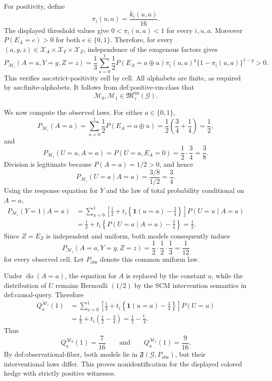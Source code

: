 For positivity, define
\[
 \pi_i(u,a)=\frac{k_i(u,a)}{16}.
\]
The displayed threshold values give \(0<\pi_i(u,a)<1\) for every \(i,u,a\).  Moreover \(P(E_A=e)>0\) for both \(e\in\{0,1\}\).  Therefore, for every \((a,y,z)\in\mathcal X_A\times\mathcal X_Y\times\mathcal X_Z\), independence of the exogenous factors gives
\[
 P_{\mathcal M_i}(A=a,Y=y,Z=z)
 =\frac13\sum_{u=0}^1
 \frac12 P(E_A=a\oplus u)
 \pi_i(u,a)^y\{1-\pi_i(u,a)\}^{1-y}>0.
\]
This verifies ass:strict-positivity cell by cell.  All alphabets are finite, as required by ass:finite-alphabets.  It follows from def:positive-rm-class that
\[
 \mathcal M_0,\mathcal M_1\in
 \mathfrak M_{+}^{\mathrm{rm}}(\mathcal G).
\]

We now compute the observed laws.  For either \(a\in\{0,1\}\),
\[
 P_{\mathcal M_i}(A=a)
 =\sum_{u=0}^1\frac12P(E_A=a\oplus u)
 =\frac12\left(\frac34+\frac14\right)
 =\frac12,
\]
and
\[
 P_{\mathcal M_i}(U=a,A=a)
 =P(U=a,E_A=0)
 =\frac12\cdot\frac34
 =\frac38.
\]
Division is legitimate because \(P(A=a)=1/2>0\), and hence
\[
 P_{\mathcal M_i}(U=a\mid A=a)=\frac{3/8}{1/2}=\frac34.
\]
Using the response equation for \(Y\) and the law of total probability conditional on \(A=a\),
\[
 \begin{aligned}
 P_{\mathcal M_i}(Y=1\mid A=a)
 &=\sum_{u=0}^1
 \left[\frac12+t_i\left\{\mathbf 1(u=a)-\frac34\right\}\right]
 P(U=u\mid A=a)\\
 &=\frac12+t_i\left\{P(U=a\mid A=a)-\frac34\right\}
 =\frac12.
 \end{aligned}
\]
Since \(Z=E_Z\) is independent and uniform, both models consequently induce
\[
 P_{\mathcal M_i}(A=a,Y=y,Z=z)
 =\frac12\cdot\frac12\cdot\frac13
 =\frac1{12}
\]
for every observed cell.  Let \(P_{\mathrm{obs}}\) denote this common uniform law.

Under \(\operatorname{do}(A=a)\), the equation for \(A\) is replaced by the constant \(a\), while the distribution of \(U\) remains Bernoulli \(\left(1/2\right)\) by the SCM intervention semantics in def:causal-query.  Therefore
\[
 \begin{aligned}
 Q_a^{\mathcal M_i}(1)
 &=\sum_{u=0}^1
 \left[\frac12+t_i\left\{\mathbf 1(u=a)-\frac34\right\}\right]P(U=u)\\
 &=\frac12+t_i\left(\frac12-\frac34\right)
 =\frac12-\frac{t_i}{4}.
 \end{aligned}
\]
Thus
\[
 Q_a^{\mathcal M_0}(1)=\frac7{16}
 \qquad\text{and}\qquad
 Q_a^{\mathcal M_1}(1)=\frac9{16}.
\]
By def:observational-fiber, both models lie in \(\mathfrak F(\mathcal G,P_{\mathrm{obs}})\), but their interventional laws differ.  This proves nonidentification for the displayed colored hedge with strictly positive witnesses.

